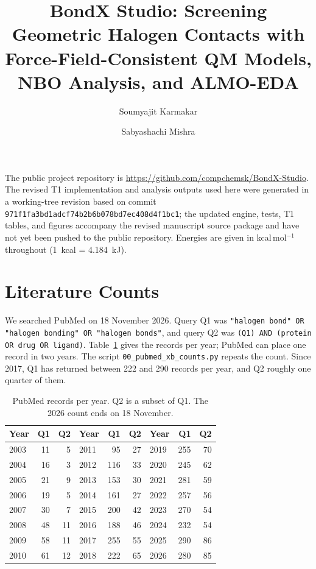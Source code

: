 \documentclass[journal=jcisd8,manuscript=suppinfo]{achemso}
\author{Soumyajit Karmakar}
\author{Sabyashachi Mishra}
\affiliation[IIT Kharagpur]{Department of Chemistry, Indian Institute of Technology Kharagpur, Kharagpur 721302, India}
\title{BondX Studio: Screening Geometric Halogen Contacts with Force-Field-Consistent QM Models, NBO Analysis, and ALMO-EDA}
\begin{document}
\begin{singlespace}
\maketitle
{\makeatletter\patchcmd{\l@section}{1.5em}{2.1em}{}{}\makeatother\tableofcontents}

\noindent The public project repository is \url{https://github.com/compchemsk/BondX-Studio}. The revised T1 implementation and analysis outputs used here were generated in a working-tree revision based on commit \texttt{971f1fa3bd1adcf74b2b6b078bd7ec408d4f1bc1}; the updated engine, tests, T1 tables, and figures accompany the revised manuscript source package and have not yet been pushed to the public repository. Energies are given in kcal\,mol$^{-1}$ throughout (1~kcal = 4.184~kJ).


\section{Literature Counts}
\label{sec:counts}

{\sloppy We searched PubMed on 18 November 2026.\cite{PubMed2026} Query Q1 was \texttt{"halogen bond" OR "halogen bonding" OR "halogen bonds"}, and query Q2 was \texttt{(Q1) AND (protein OR drug OR ligand)}. Table~\ref{tab:counts} gives the records per year; PubMed can place one record in two years. The script \texttt{00\_pubmed\_xb\_counts.py} repeats the count. Since 2017, Q1 has returned between 222 and 290 records per year, and Q2 roughly one quarter of them.\par}

\begin{table}[!htbp]
\caption{PubMed records per year. Q2 is a subset of Q1. The 2026 count ends on 18 November.}
\label{tab:counts}
\centering\footnotesize
\begin{tabular}{@{}lrr|lrr|lrr@{}}
\toprule
Year & Q1 & Q2 & Year & Q1 & Q2 & Year & Q1 & Q2 \\
\midrule
2003 & 11 & 5   & 2011 & 95 & 27  & 2019 & 255 & 70 \\
2004 & 16 & 3   & 2012 & 116 & 33 & 2020 & 245 & 62 \\
2005 & 21 & 9   & 2013 & 153 & 30 & 2021 & 281 & 59 \\
2006 & 19 & 5   & 2014 & 161 & 27 & 2022 & 257 & 56 \\
2007 & 30 & 7   & 2015 & 200 & 42 & 2023 & 270 & 54 \\
2008 & 48 & 11  & 2016 & 188 & 46 & 2024 & 232 & 54 \\
2009 & 58 & 11  & 2017 & 255 & 55 & 2025 & 290 & 86 \\
2010 & 61 & 12  & 2018 & 222 & 65 & 2026 & 280 & 85 \\
\bottomrule
\end{tabular}
\end{table}


\end{singlespace}
\end{document}
